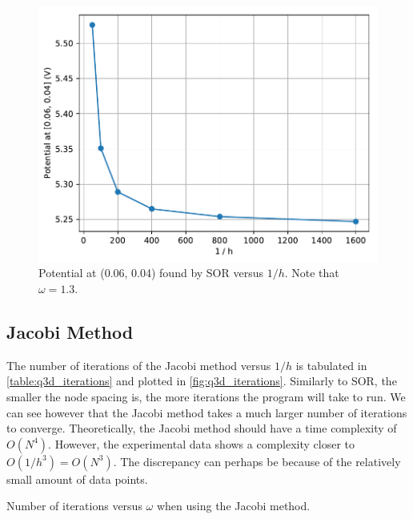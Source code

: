 \documentclass[a4paper,titlepage]{article}
\begin{document}
	\begin{figure}[!htb]
		\centering
		\includegraphics[width=\columnwidth]{plots/q3c_potential.pdf}
		\caption
		{Potential at (0.06, 0.04) found by SOR versus $1/h$. Note that $\omega=1.3$.}
		\label{fig:q3c_potential}
	\end{figure}
	
	\subsection{Jacobi Method}
	
	The number of iterations of the Jacobi method versus $1/h$ is tabulated in \autoref{table:q3d_iterations} and plotted in \autoref{fig:q3d_iterations}. Similarly to SOR, the smaller the node spacing is, the more iterations the program will take to run. We can see however that the Jacobi method takes a much larger number of iterations to converge. Theoretically, the Jacobi method should have a time complexity of $O(N^4)$. However, the experimental data shows a complexity closer to $O(1/h^3) = O(N^3)$. The discrepancy can perhaps be because of the relatively small amount of data points.
	
	\begin{table}[!htb]
		\centering
		\caption{Number of iterations versus $\omega$ when using the Jacobi method.}
		\label{table:q3d_iterations}
	\end{table}
\end{document}
